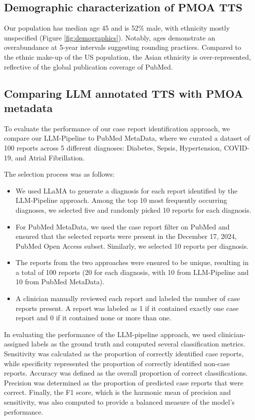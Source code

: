 \documentclass[pmlr]{jmlr}%
\begin{document}
\subsection{Demographic characterization of PMOA TTS}
Our population has median age 45 and is 52\% male, with ethnicity mostly unspecified (Figure \ref{fig:demographics}).
Notably, ages demonstrate an overabundance at 5-year intervals suggesting rounding practices.  Compared to the ethnic make-up of the US population, the Asian ethnicity is over-represented, reflective of the global publication coverage of PubMed. 

\subsection{Comparing LLM annotated TTS with PMOA metadata}

To evaluate the performance of our case report identification approach, we compare our LLM-Pipeline to PubMed MetaData, where we curated a dataset of 100 reports across 5 different diagnoses: Diabetes, Sepsis, Hypertension, COVID-19, and Atrial Fibrillation.

The selection process was as follows:
\begin{itemize}
    \item We used LLaMA to generate a diagnosis for each report identified by the LLM-Pipeline approach. Among the top 10 most frequently occurring diagnoses, we selected five and randomly picked 10 reports for each diagnosis.
    \item For PubMed MetaData, we used the case report filter on PubMed and ensured that the selected reports were present in the December 17, 2024, PubMed Open Access subset. Similarly, we selected 10 reports per diagnosis.
    \item The reports from the two approaches were ensured to be unique, resulting in a total of 100 reports (20 for each diagnosis, with 10 from LLM-Pipeline and 10 from PubMed MetaData).
    \item A clinician manually reviewed each report and labeled the number of case reports present. A report was labeled as 1 if it contained exactly one case report and 0 if it contained none or more than one.
\end{itemize}

In evaluating the performance of the LLM-pipeline approach, we used clinician-assigned labels as the ground truth and computed several classification metrics. Sensitivity was calculated as the proportion of correctly identified case reports, while specificity represented the proportion of correctly identified non-case reports. Accuracy was defined as the overall proportion of correct classifications. Precision was determined as the proportion of predicted case reports that were correct. Finally, the F1 score, which is the harmonic mean of precision and sensitivity, was also computed to provide a balanced measure of the model's performance.
\end{document}
